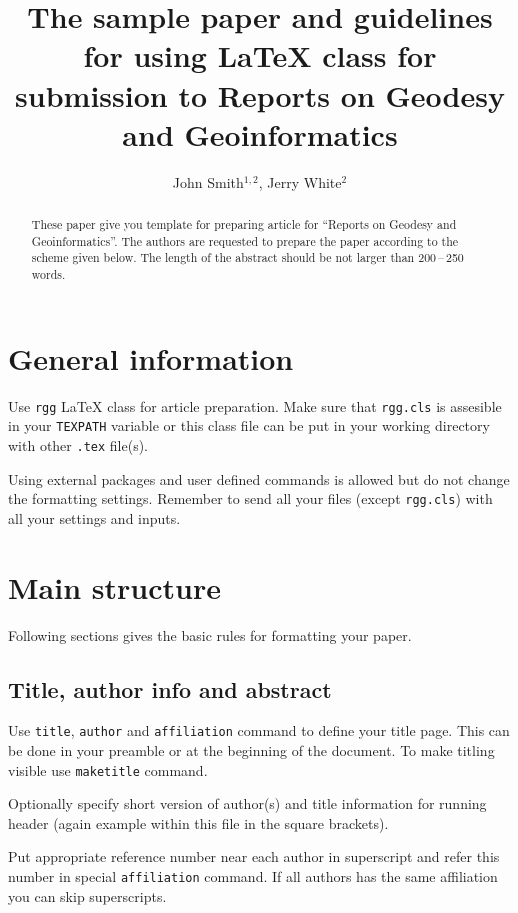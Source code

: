 \documentclass{rgg}
\title[The sample paper\ldots]{The sample paper and guidelines for using \LaTeX{} class for submission to Reports on Geodesy and Geoinformatics}
\author[Smith, J., White, J.]{John Smith$^{1,2}$, Jerry White$^2$}
\affiliation{1 Department of Very Important Issues}
\begin{document}
    \maketitle

    \begin{abstract}
      These paper give you template for preparing article for ``Reports on 
      Geodesy and Geoinformatics''. The authors are requested to prepare the 
      paper according to the scheme given below. The length of the abstract 
      should be not larger than 200\,–\,250 words.
    \end{abstract}

  \section{General information}
    Use \texttt{rgg} LaTeX class for article preparation.
    Make sure that \texttt{rgg.cls} is assesible in your
    \texttt{TEXPATH} variable or this class file can be put
    in your working directory with other \texttt{.tex} file(s).

    Using external packages and user defined commands is allowed
    but do not change the formatting settings.
    Remember to send all your files (except \texttt{rgg.cls}) 
    with all your settings and inputs.
    
    
  \section{Main structure}
    \label{labelforsection}

    Following sections gives the basic rules for formatting your
    paper.

  \subsection{Title, author info and abstract}
    Use \texttt{title}, \texttt{author} 
    and \texttt{affiliation} command
    to define your title page. This can be done
    in your preamble or at the beginning of the document.
    To make titling visible use \texttt{maketitle} command.

    Optionally specify short version of author(s) and title information
    for running header (again example within this file in the square brackets).

    Put appropriate reference number near each author in superscript
    and refer this number in special \texttt{affiliation} command.
    If all authors has the same affiliation you can skip superscripts.
    
\end{document}
